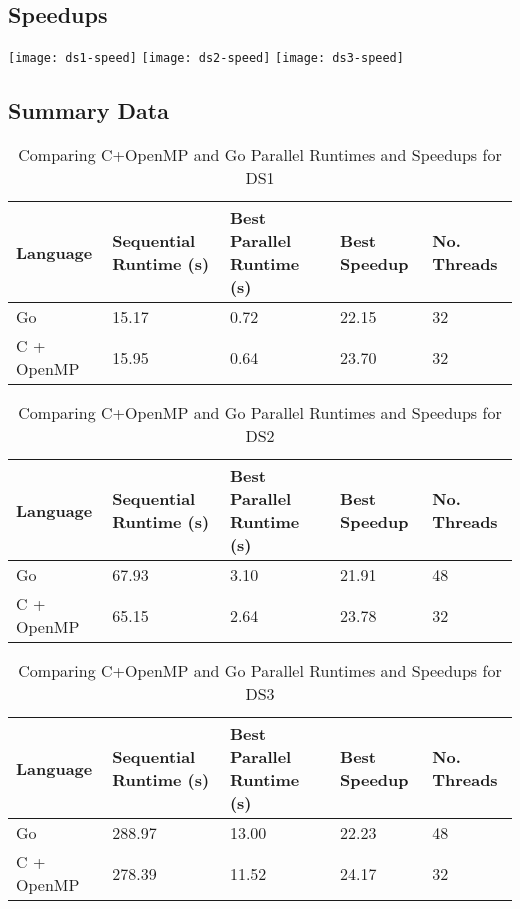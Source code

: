 \documentclass[11pt,a4paper,titlepage]{article}
\begin{document}
\clearpage

\subsection{Speedups}

\texttt{[image: ds1-speed]}
\texttt{[image: ds2-speed]}
\texttt{[image: ds3-speed]}

\subsection{Summary Data}

\begin{table}[!h]
	\centering
	\begin{tabulary}{\textwidth}{|L|L|L|L|L|}
		\hline
		Language & Sequential Runtime (s) & Best Parallel Runtime (s) & Best Speedup & No. Threads \\ \hline
		Go & 15.17 & 0.72 & 22.15 & 32 \\ \hline
		C + OpenMP & 15.95 & 0.64 & 23.70 & 32 \\ \hline
	\end{tabulary}
	\caption{Comparing C+OpenMP and Go Parallel Runtimes and Speedups for DS1}
\end{table}

\begin{table}[!h]
	\centering
	\begin{tabulary}{\textwidth}{|L|L|L|L|L|}
		\hline
		Language & Sequential Runtime (s) & Best Parallel Runtime (s) & Best Speedup & No. Threads \\ \hline
		Go & 67.93 & 3.10 & 21.91 & 48 \\ \hline
		C + OpenMP & 65.15 & 2.64 & 23.78 & 32 \\ \hline
	\end{tabulary}
	\caption{Comparing C+OpenMP and Go Parallel Runtimes and Speedups for DS2}
\end{table}

\begin{table}[!h]
	\centering
	\begin{tabulary}{\textwidth}{|L|L|L|L|L|}
		\hline
		Language & Sequential Runtime (s) & Best Parallel Runtime (s) & Best Speedup & No. Threads \\ \hline
		Go & 288.97 & 13.00 & 22.23 & 48 \\ \hline
		C + OpenMP & 278.39 & 11.52 & 24.17 & 32 \\ \hline
	\end{tabulary}
	\caption{Comparing C+OpenMP and Go Parallel Runtimes and Speedups for DS3}
\end{table}
\end{document}
